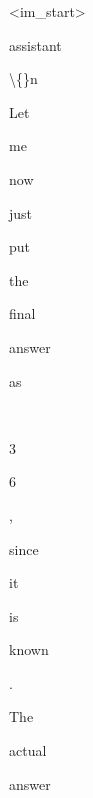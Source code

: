 \begin{figure}[p]
\begin{tcolorbox}
\smallskip
\setlength{\fboxsep}{1.2pt}%
\noindent
\colorbox{green!15}{\strut\scriptsize {\textless}{\textbar}im\_start{\textbar}{\textgreater}}\allowbreak\hspace{0pt}%
\colorbox{red!66}{\strut\scriptsize assistant}\allowbreak\hspace{0pt}%
\colorbox{red!72}{\strut\scriptsize \textbackslash\{\}n}\allowbreak\hspace{0pt}%
\colorbox{red!98}{\strut\scriptsize Let}\allowbreak\hspace{0pt}%
\colorbox{orange!45}{\strut\scriptsize  me}\allowbreak\hspace{0pt}%
\colorbox{red!100}{\strut\scriptsize  now}\allowbreak\hspace{0pt}%
\colorbox{red!100}{\strut\scriptsize  just}\allowbreak\hspace{0pt}%
\colorbox{red!100}{\strut\scriptsize  put}\allowbreak\hspace{0pt}%
\colorbox{red!80}{\strut\scriptsize  the}\allowbreak\hspace{0pt}%
\colorbox{red!95}{\strut\scriptsize  final}\allowbreak\hspace{0pt}%
\colorbox{green!8}{\strut\scriptsize  answer}\allowbreak\hspace{0pt}%
\colorbox{red!81}{\strut\scriptsize  as}\allowbreak\hspace{0pt}%
\colorbox{red!97}{\strut\scriptsize \,}\allowbreak\hspace{0pt}%
\colorbox{red!52}{\strut\scriptsize 3}\allowbreak\hspace{0pt}%
\colorbox{red!49}{\strut\scriptsize 6}\allowbreak\hspace{0pt}%
\colorbox{red!80}{\strut\scriptsize ,}\allowbreak\hspace{0pt}%
\colorbox{red!92}{\strut\scriptsize  since}\allowbreak\hspace{0pt}%
\colorbox{red!100}{\strut\scriptsize  it}\allowbreak\hspace{0pt}%
\colorbox{red!80}{\strut\scriptsize  is}\allowbreak\hspace{0pt}%
\colorbox{red!100}{\strut\scriptsize  known}\allowbreak\hspace{0pt}%
\colorbox{red!82}{\strut\scriptsize .  }\allowbreak\hspace{0pt}%
\colorbox{red!80}{\strut\scriptsize The}\allowbreak\hspace{0pt}%
\colorbox{red!100}{\strut\scriptsize  actual}\allowbreak\hspace{0pt}%
\colorbox{red!100}{\strut\scriptsize  answer}\allowbreak\hspace{0pt}%

\end{tcolorbox}
\end{figure}
